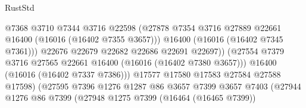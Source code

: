 \begin{lexlean}{RustStd}
\begin{coremodule}
                                              @7368
                                              @3710
                                              @7344
                                              @3716
                                              @22598
                                              (@27878
                                                @7354
                                                @3716
                                                @27889
                                                @22661
                                                @16400
                                                (@16016 (@16402 @7355 @3657)))
                                              @16400
                                              (@16016 (@16402 @7345 @7361)))
                                            @22676
                                            @22679
                                            @22682
                                            @22686
                                            @22691
                                            @22697))
                                        (@27554
                                          @7379
                                          @3716
                                          @27565
                                          @22661
                                          @16400
                                          (@16016 (@16402 @7380 @3657)))
                                        @16400
                                        (@16016 (@16402 @7337 @7386)))
                                      @17577
                                      @17580
                                      @17583
                                      @27584
                                      @27588
                                      @17598)
                                    (@27595
                                      @7396
                                      @1276
                                      @1287
                                      @86
                                      @3657
                                      @7399
                                      @3657
                                      @7403
                                      (@27944
                                        @1276
                                        @86
                                        @7399
                                        (@27948
                                          @1275
                                          @7399
                                          (@16464 (@16465 @7399))

\end{coremodule}
\end{lexlean}

